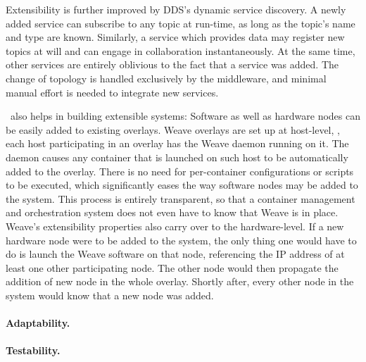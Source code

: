 Extensibility is further improved by DDS's dynamic service discovery. A newly added service can subscribe to any topic at run-time, as long as the topic's name and type are known. Similarly, a service which provides data may register new topics at will and can engage in collaboration instantaneously. At the same time, other services are entirely oblivious to the fact that a service was added. The change of topology is handled exclusively by the middleware, and minimal manual effort is needed to integrate new services.

\wnet\ also helps in building extensible systems: Software as well as hardware nodes can be easily added to existing overlays. Weave overlays are set up at host-level, \ie , each host participating in an overlay has the Weave daemon running on it. The daemon causes any container that is launched on such host to be automatically added to the overlay. There is no need for per-container configurations or scripts to be executed, which significantly eases the way software nodes may be added to the system. This process is entirely transparent, so that a container management and orchestration system does not even have to know that Weave is in place. Weave's extensibility properties also carry over to the hardware-level. If a new hardware node were to be added to the system, the only thing one would  have to do is launch the Weave software on that node, referencing the IP address of at least one other participating node. The other node would then propagate the addition of new node in the whole overlay. Shortly after, every other node in the system would know that a new node was added.


\paragraph{Adaptability.}

\paragraph{Testability.}



